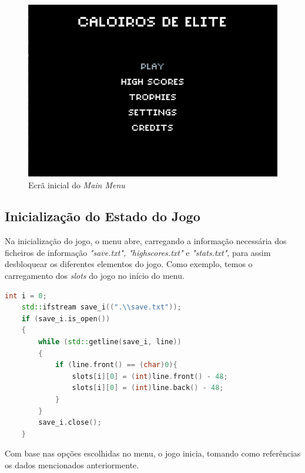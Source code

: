 \documentclass[a4paper,11pt]{article}
\begin{document}
\vspace{8pt}

\begin{figure}[H]
    \centering
    \includegraphics[scale = 0.50]{1 - Imagens/MainMenu.png}
    \caption{Ecrã inicial do \textit{Main Menu}}
    \label{fig:MainMenu}
\end{figure}

\subsection{Inicialização do Estado do Jogo}

\vspace{8pt}

Na inicialização do jogo, o menu abre, carregando a informação necessária dos ficheiros de informação \textit{"save.txt", "highscores.txt"} e \textit{"stats.txt"}, para assim desbloquear os diferentes elementos do jogo. Como exemplo, temos o carregamento dos \textit{slots} do jogo no início do menu.

\begin{lstlisting}[language = C++]
    int i = 0;
    std::ifstream save_i((".\\save.txt"));
    if (save_i.is_open())
    {
        while (std::getline(save_i, line))
        {
            if (line.front() == (char)0){
                slots[i][0] = (int)line.front() - 48;
                slots[i][0] = (int)line.back() - 48;
            }
        }
        save_i.close();
    }
    \end{lstlisting}

\vspace{8pt}

Com base nas opções escolhidas no menu, o jogo inicia, tomando como referências os dados mencionados anteriormente.
\end{document}
